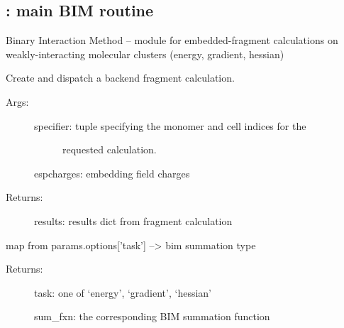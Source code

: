 \documentclass[letterpaper,10pt,english]{sphinxmanual}
\begin{document}
\subsection{: main BIM routine}
\label{\detokenize{bim:module-bim.bim}}\label{\detokenize{bim:bim-main-bim-routine}}
Binary Interaction Method -- module for embedded-fragment calculations on
weakly-interacting molecular clusters (energy, gradient, hessian)

\begin{fulllineitems}
\label{\detokenize{bim:bim.bim.create_bim_fragment}}
Create and dispatch a backend fragment calculation.
\begin{description}
\item[{Args:}] \leavevmode\begin{description}
\item[{specifier: tuple specifying the monomer and cell indices for the}] \leavevmode
requested calculation.

\end{description}

espcharges: embedding field charges

\item[{Returns:}] \leavevmode
results: results dict from fragment calculation

\end{description}

\end{fulllineitems}


\begin{fulllineitems}
\label{\detokenize{bim:bim.bim.get_task}}
map from params.options{[}'task'{]} --\textgreater{} bim summation type
\begin{description}
\item[{Returns:}] \leavevmode
task: one of `energy', `gradient', `hessian'

sum\_fxn: the corresponding BIM summation function

\end{description}

\end{fulllineitems}
\end{document}
